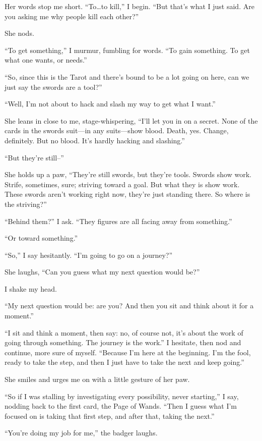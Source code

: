 Her words stop me short. ``To\ldots{}to kill,'' I begin. ``But that's what I just said. Are you asking me why people kill each other?''

She nods.

``To get something,'' I murmur, fumbling for words. ``To gain something. To get what one wants, or needs.''

``So, since this is the Tarot and there's bound to be a lot going on here, can we just say the swords are a tool?''

``Well, I'm not about to hack and slash my way to get what I want.''

She leans in close to me, stage-whispering, ``I'll let you in on a secret. None of the cards in the swords suit---in any suits---show blood. Death, yes. Change, definitely. But no blood. It's hardly hacking and slashing.''

``But they're still--''

She holds up a paw, ``They're still swords, but they're tools. Swords show work. Strife, sometimes, sure; striving toward a goal. But what they is show work. These swords aren't working right now, they're just standing there. So where is the striving?''

``Behind them?'' I ask. ``They figures are all facing away from something.''

``Or toward something.''

``So,'' I say hesitantly. ``I'm going to go on a journey?''

She laughs, ``Can you guess what my next question would be?''

I shake my head.

``My next question would be: are you? And then you sit and think about it for a moment.''

``I sit and think a moment, then say: no, of course not, it's about the work of going through something. The journey is the work.'' I hesitate, then nod and continue, more sure of myself. ``Because I'm here at the beginning. I'm the fool, ready to take the step, and then I just have to take the next and keep going.''

She smiles and urges me on with a little gesture of her paw.

``So if I was stalling by investigating every possibility, never starting,'' I say, nodding back to the first card, the Page of Wands. ``Then I guess what I'm focused on is taking that first step, and after that, taking the next.''

``You're doing my job for me,'' the badger laughs.

